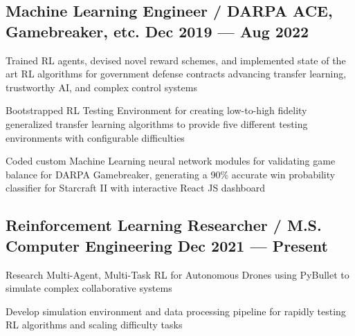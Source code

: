 \subsection{{Machine Learning Engineer / DARPA ACE, Gamebreaker, etc. \hfill Dec 2019 --- Aug 2022}}
\begin{zitemize}
	\item Trained RL agents, devised novel reward schemes, and implemented state of the art RL algorithms for government defense contracts advancing transfer learning, trustworthy AI, and complex
	control systems
	\item Bootstrapped RL Testing Environment for creating low-to-high fidelity generalized transfer learning algorithms
	to provide five different testing environments with configurable difficulties
	\item Coded custom Machine Learning neural network modules for validating game balance for DARPA Gamebreaker, generating a 90\%
	accurate win probability classifier for Starcraft II with interactive React JS dashboard
\end{zitemize}

\subsection{{Reinforcement Learning Researcher / M.S. Computer Engineering  \hfill Dec 2021 --- Present}}
\begin{zitemize}
	\item Research Multi-Agent, Multi-Task RL for Autonomous Drones using PyBullet to simulate
	complex collaborative systems
	\item Develop simulation environment and data processing pipeline for rapidly testing RL algorithms and scaling
    difficulty tasks
\end{zitemize}


